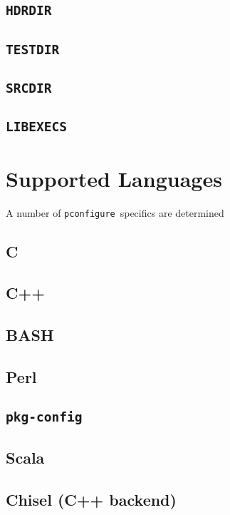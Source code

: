 \documentclass{article}
\newcommand{\pconfigure}{\texttt{pconfigure}}
\begin{document}
\subsection{\texttt{HDRDIR}}

\subsection{\texttt{TESTDIR}}

\subsection{\texttt{SRCDIR}}

\subsection{\texttt{LIBEXECS}}

\section{Supported Languages \label{lang}}

A number of \pconfigure\ specifics are determined

\subsection{C}

\subsection{C++}

\subsection{BASH}

\subsection{Perl}

\subsection{\texttt{pkg-config}}

\subsection{Scala}

\subsection{Chisel (C++ backend)}
\end{document}
